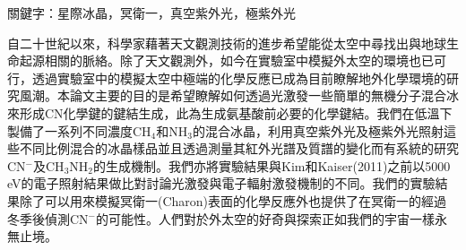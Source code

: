\begin{abstractcn}

關鍵字：星際冰晶，冥衛一，真空紫外光，極紫外光
\vspace{2em}

自二十世紀以來，科學家藉著天文觀測技術的進步希望能從太空中尋找出與地球生命起源相關的脈絡。除了天文觀測外，如今在實驗室中模擬外太空的環境也已可行，透過實驗室中的模擬太空中極端的化學反應已成為目前瞭解地外化學環境的研究風潮。本論文主要的目的是希望瞭解如何透過光激發一些簡單的無機分子混合冰來形成CN化學鍵的鍵結生成，此為生成氨基酸前必要的化學鍵結。我們在低溫下製備了一系列不同濃度CH$_4$和NH$_3$的混合冰晶，利用真空紫外光及極紫外光照射這些不同比例混合的冰晶樣品並且透過測量其紅外光譜及質譜的變化而有系統的研究CN$^-$及CH$_3$NH$_2$的生成機制。我們亦將實驗結果與Kim和Kaiser(2011)\cite{kim}之前以5000 eV的電子照射結果做比對討論光激發與電子輻射激發機制的不同。我們的實驗結果除了可以用來模擬冥衛一(Charon)表面的化學反應外也提供了在冥衛一的經過冬季後偵測CN$^-$的可能性。人們對於外太空的好奇與探索正如我們的宇宙一樣永無止境。


\end{abstractcn} 
